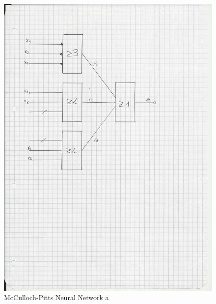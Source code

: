 \documentclass{scrartcl}
\begin{document}
\begin{figure}[ht]
\begin{center}
\includegraphics[scale=0.3]{Attachment1.jpg}
\end{center}
\caption{McCulloch-Pitts Neural Network a}
\label{Img:McCulloch-Pitts a}
\end{figure}
\end{document}
